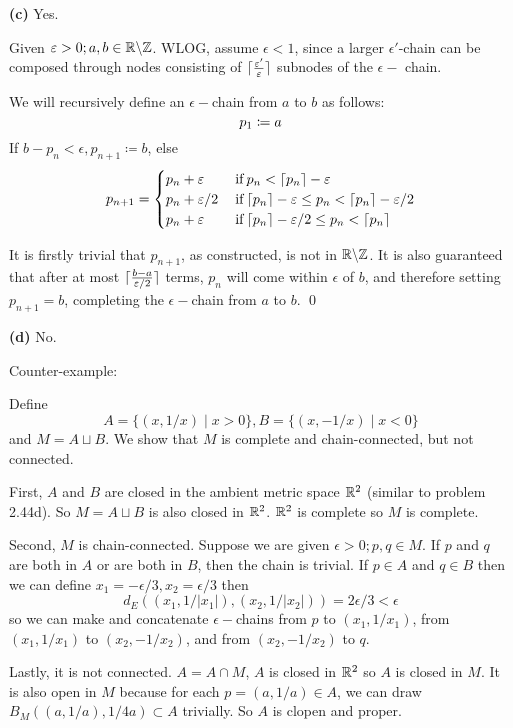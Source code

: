 \documentclass[a4paper, 12pt]{article}
\begin{document}
\begin{solution}
    \textbf{(c)} Yes.

    Given $\varepsilon > 0; a, b \in \mathbb{R} \backslash \mathbb{Z}$. WLOG, assume $\epsilon < 1$, since a larger $\epsilon'$-chain can be composed through nodes consisting of $\lceil\frac{\varepsilon'}{\varepsilon}\rceil$ subnodes of the $\epsilon-$ chain.

    We will recursively define an $\epsilon-$chain from $a$ to $b$ as follows:
    \[
        p_1 \coloneqq a \\
    \]
    If $b - p_n < \epsilon, p_{n+1} \coloneqq b$, else
    \[
        p_{n+1} = \begin{cases}
            p_n + \varepsilon   & \:\text{if}\: p_n  < \lceil p_n\rceil - \varepsilon                              \\
            p_n + \varepsilon/2 & \:\text{if}\: \lceil p_n\rceil - \varepsilon \leq p_n < \lceil p_n\rceil - \varepsilon /2 \\
            p_n + \varepsilon   & \:\text{if}\: \lceil p_n\rceil - \varepsilon /2 \leq p_n < \lceil p_n\rceil
        \end{cases}
    \]

    It is firstly trivial that $p_{n+1}$, as constructed, is not in $\mathbb{R} \backslash \mathbb{Z}$. It is also guaranteed that after at most $\lceil\frac{b-a}{\varepsilon / 2}\rceil$ terms, $p_n$ will come within $\epsilon$ of $b$, and therefore setting $p_{n+1} = b$, completing the $\epsilon-$chain from $a$ to $b$. \qed

    \textbf{(d)} No.

    Counter-example: 

    Define \[
    A = \{(x, 1/x) \mid x > 0\}, B = \{(x, -1/x) \mid x < 0\}
    \]
    and $M = A \sqcup B$. We show that $M$ is complete and chain-connected, but not connected.

    First, $A$ and $B$ are closed in the ambient metric space $\mathbb{R}^2$ (similar to problem 2.44d). So $M = A \sqcup B$ is also closed in $\mathbb{R}^2$. $\mathbb{R}^2$ is complete so $M$ is complete.

    Second, $M$ is chain-connected. Suppose we are given $\epsilon > 0; p, q \in M$. If $p$ and $q$ are both in $A$ or are both in $B$, then the chain is trivial. If $p \in A$ and $q \in B$ then we can define $x_1 = -\epsilon/3, x_2 = \epsilon/3$ then \[
    d_E((x_1, 1/|x_1|), (x_2, 1/|x_2|)) = 2\epsilon / 3 < \epsilon
    \]
    so we can make and concatenate $\epsilon-$chains from $p$ to $(x_1, 1/x_1)$, from $(x_1, 1/x_1)$ to $(x_2, -1/x_2)$, and from $(x_2, -1/x_2)$ to $q$.

    Lastly, it is not connected. $A = A \cap M$, $A$ is closed in $\mathbb{R}^2$ so $A$ is closed in $M$. It is also open in $M$ because for each $p = (a, 1/a) \in A$, we can draw $B_M((a, 1/a), 1/4a) \subset A$ trivially. So $A$ is clopen and proper.
\end{solution}
\end{document}
